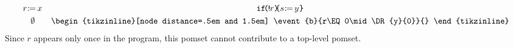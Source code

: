 \begin{example}
\begin{align*}
    \begin{gathered}[t]
      \PR{x}{r}
      \\
      \emptyset
    \end{gathered}    
    &&
    \begin{gathered}[t]
      \IF{\BANG r}\THEN\PR{y}{s}\FI
      \\
      \hbox{\begin{tikzinline}[node distance=.5em and 1.5em]
          \event{b}{r\EQ0\mid\DR{y}{0}}{}
        \end{tikzinline}}
    \end{gathered}    
  \end{align*}
  Since $r$ appears only once in the program, this pomset cannot contribute
  to a top-level pomset.
\end{example}


